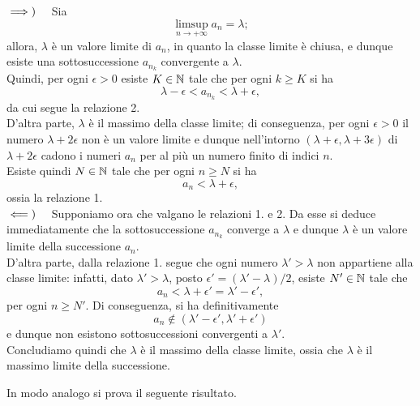 \begin{demonstrationcaput}
$\implies)\quad$  Sia 
\begin{equation*}
	\limsup_{n\to +\infty} a_n =\lambda;
\end{equation*}
allora, $\lambda$ è un valore limite di $a_n$, in quanto la classe limite è chiusa, e dunque esiste una sottosuccessione $a_{n_k}$ convergente a $\lambda$.\\
Quindi, per ogni $\epsilon >0$ esiste $K\in \mathbb{N}$ tale che per ogni $k\geq K$ si ha
\begin{equation*}
	\lambda-\epsilon < a_{n_k} <\lambda +\epsilon,
\end{equation*}
da cui segue la relazione 2.\\ 
D'altra parte, $\lambda$ è il massimo della classe limite; di conseguenza, per ogni $\epsilon > 0$ il numero $\lambda +2\epsilon$ non è un valore limite e dunque nell'intorno $(\lambda +\epsilon, \lambda +3\epsilon)$ di $\lambda +2\epsilon$ cadono i numeri $a_n$ per al più un numero finito di indici $n$.\\
Esiste quindi $N\in \mathbb{N}$ tale che per ogni $n\geq N$ si ha 
\begin{equation*}
	a_n <\lambda +\epsilon,
\end{equation*}
ossia la relazione 1.\\
$\impliedby)\quad$ Supponiamo ora che valgano le relazioni 1. e 2. Da esse si deduce immediatamente che la sottosuccessione $a_{n_k}$ converge a $\lambda$ e dunque $\lambda$ è un valore limite della successione $a_n$.\\
D'altra parte, dalla relazione 1. segue che ogni numero $\lambda '>\lambda$ non appartiene alla classe limite: infatti, dato  $\lambda '>\lambda$, posto $\epsilon' = (\lambda'-\lambda)/2$, esiste $N'\in \mathbb{N}$ tale che
\begin{equation*}
	a_n< \lambda +\epsilon' = \lambda'-\epsilon ',
\end{equation*}
per ogni $n\geq N'$. Di conseguenza, si ha definitivamente
\begin{equation*}
	a_n \notin (\lambda' -\epsilon',\lambda'+\epsilon')
\end{equation*}
e dunque non esistono sottosuccessioni convergenti a $\lambda'$.\\
Concludiamo quindi che $\lambda$ è il massimo della classe limite, ossia che $\lambda$ è il massimo limite della successione.
\end{demonstrationcaput}
In modo analogo si prova il seguente risultato.
